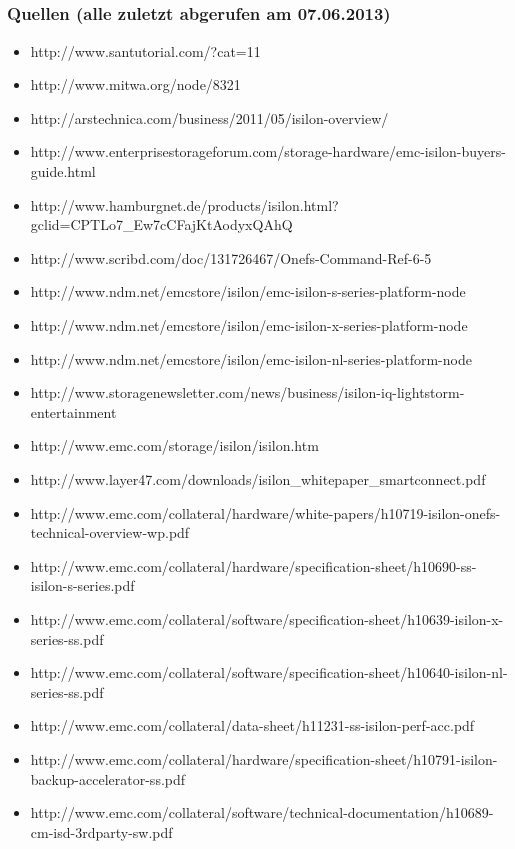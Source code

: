 \documentclass{beamer}
\begin{document}
\subsection{}
\begin{frame}[fragile]
  \frametitle{Quellen (alle zuletzt abgerufen am 07.06.2013)}

  \tiny
  \begin{itemize}
    \item http://www.santutorial.com/?cat=11
    \item http://www.mitwa.org/node/8321
    \item http://arstechnica.com/business/2011/05/isilon-overview/
    \item http://www.enterprisestorageforum.com/storage-hardware/emc-isilon-buyers-guide.html
    \item http://www.hamburgnet.de/products/isilon.html?gclid=CPTLo7\_Ew7cCFajKtAodyxQAhQ
    \item http://www.scribd.com/doc/131726467/Onefs-Command-Ref-6-5
    \item http://www.ndm.net/emcstore/isilon/emc-isilon-s-series-platform-node
    \item http://www.ndm.net/emcstore/isilon/emc-isilon-x-series-platform-node
    \item http://www.ndm.net/emcstore/isilon/emc-isilon-nl-series-platform-node
    \item http://www.storagenewsletter.com/news/business/isilon-iq-lightstorm-entertainment
    \item http://www.emc.com/storage/isilon/isilon.htm 
    \item http://www.layer47.com/downloads/isilon\_whitepaper\_smartconnect.pdf
    \item http://www.emc.com/collateral/hardware/white-papers/h10719-isilon-onefs-technical-overview-wp.pdf
    \item http://www.emc.com/collateral/hardware/specification-sheet/h10690-ss-isilon-s-series.pdf
    \item http://www.emc.com/collateral/software/specification-sheet/h10639-isilon-x-series-ss.pdf
    \item http://www.emc.com/collateral/software/specification-sheet/h10640-isilon-nl-series-ss.pdf
    \item http://www.emc.com/collateral/data-sheet/h11231-ss-isilon-perf-acc.pdf
    \item http://www.emc.com/collateral/hardware/specification-sheet/h10791-isilon-backup-accelerator-ss.pdf
    \item http://www.emc.com/collateral/software/technical-documentation/h10689-cm-isd-3rdparty-sw.pdf
    
  \end{itemize}

\end{frame}
\end{document}
